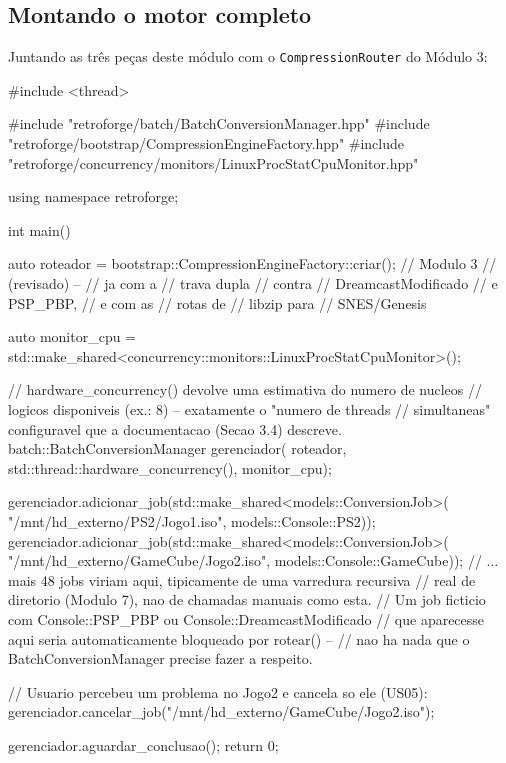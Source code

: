 \subsection{Montando o motor completo}

Juntando as três peças deste módulo com o \texttt{CompressionRouter} do Módulo 3:

\begin{CaixaCodigo}
#include <thread>

#include "retroforge/batch/BatchConversionManager.hpp"
#include "retroforge/bootstrap/CompressionEngineFactory.hpp"
#include "retroforge/concurrency/monitors/LinuxProcStatCpuMonitor.hpp"

using namespace retroforge;

int main() {
    auto roteador = bootstrap::CompressionEngineFactory::criar(); // Modulo 3
                                                                   // (revisado) --
                                                                   // ja com a
                                                                   // trava dupla
                                                                   // contra
                                                                   // DreamcastModificado
                                                                   // e PSP_PBP,
                                                                   // e com as
                                                                   // rotas de
                                                                   // libzip para
                                                                   // SNES/Genesis

    auto monitor_cpu = std::make_shared<concurrency::monitors::LinuxProcStatCpuMonitor>();

    // hardware_concurrency() devolve uma estimativa do numero de nucleos
    // logicos disponiveis (ex.: 8) -- exatamente o "numero de threads
    // simultaneas" configuravel que a documentacao (Secao 3.4) descreve.
    batch::BatchConversionManager gerenciador(
        roteador, std::thread::hardware_concurrency(), monitor_cpu);

    gerenciador.adicionar_job(std::make_shared<models::ConversionJob>(
        "/mnt/hd_externo/PS2/Jogo1.iso", models::Console::PS2));
    gerenciador.adicionar_job(std::make_shared<models::ConversionJob>(
        "/mnt/hd_externo/GameCube/Jogo2.iso", models::Console::GameCube));
    // ... mais 48 jobs viriam aqui, tipicamente de uma varredura recursiva
    // real de diretorio (Modulo 7), nao de chamadas manuais como esta.
    // Um job ficticio com Console::PSP_PBP ou Console::DreamcastModificado
    // que aparecesse aqui seria automaticamente bloqueado por rotear() --
    // nao ha nada que o BatchConversionManager precise fazer a respeito.

    // Usuario percebeu um problema no Jogo2 e cancela so ele (US05):
    gerenciador.cancelar_job("/mnt/hd_externo/GameCube/Jogo2.iso");

    gerenciador.aguardar_conclusao();
    return 0;
}
\end{CaixaCodigo}

